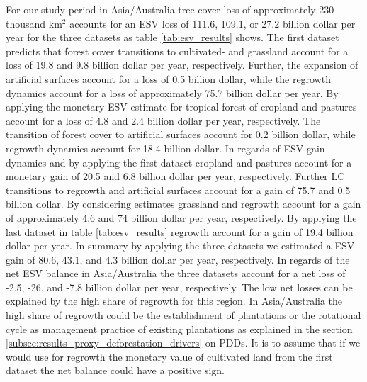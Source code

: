 		For our study period in Asia/Australia tree cover loss of approximately 230 thousand km$^2$ accounts for an \ac{ESV} loss of 111.6, 109.1, or 27.2 billion dollar per year for the three datasets as table \ref{tab:esv_results} shows. The first dataset predicts that forest cover transitions to cultivated- and grassland account for a loss of 19.8 and 9.8 billion dollar per year, respectively. Further, the expansion of artificial surfaces account for a loss of 0.5 billion dollar, while the regrowth dynamics account for a loss of approximately 75.7 billion dollar per year. By applying the monetary \ac{ESV} estimate for tropical forest of \citet{Siikamaki2015} cropland and pastures account for a loss of 4.8 and 2.4 billion dollar per year, respectively. The transition of forest cover to artificial surfaces account for 0.2 billion dollar, while regrowth dynamics account for 18.4 billion dollar. In regards of \ac{ESV} gain dynamics and by applying the first dataset cropland and pastures account for a monetary gain of 20.5 and 6.8 billion dollar per year, respectively. Further \ac{LC} transitions to regrowth and artificial surfaces account for a gain of 75.7 and 0.5 billion dollar. By considering \citet{Groot2012} estimates grassland and regrowth account for a gain of approximately 4.6 and 74 billion dollar per year, respectively. By applying the last dataset in table \ref{tab:esv_results} regrowth account for a gain of 19.4 billion dollar per year. In summary by applying the three datasets we estimated a \ac{ESV} gain of 80.6, 43.1, and 4.3 billion dollar per year, respectively. In regards of the net \ac{ESV} balance in Asia/Australia the three datasets account for a net loss of -2.5, -26, and -7.8 billion dollar per year, respectively. The low net losses can be explained by the high share of regrowth for this region. In Asia/Australia the high share of regrowth could be the establishment of plantations or the rotational cycle as management practice of existing plantations as explained in the section \ref{subsec:results_proxy_deforestation_drivers} on \acp{PDD}. It is to assume that if we would use for regrowth the monetary value of cultivated land from the first dataset the net balance could have a positive sign.

